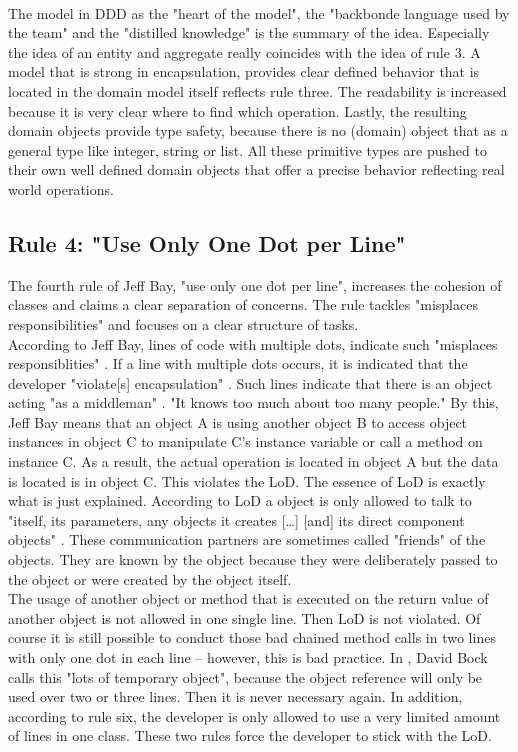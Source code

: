 \\
The model in \ac{DDD} as the "heart of the model", the "backbonde language used by the team" and the "distilled knowledge" \cite[p. 25]{dddbook} is the summary of the idea. Especially the idea of an entity and aggregate really coincides with the idea of rule 3. A model that is strong in encapsulation, provides clear defined behavior that is located in the domain model itself reflects rule three. The readability is increased because it is very clear where to find which operation. Lastly, the resulting domain objects provide type safety, because there is no (domain) object that as a general type like integer, string or list. All these primitive types are pushed to their own well defined domain objects that offer a precise behavior reflecting real world operations. 

\subsection*{Rule 4: "Use Only One Dot per Line"}
The fourth rule of Jeff Bay, "use only one dot per line", increases the cohesion of classes and claims a clear separation of concerns. The rule tackles "misplaces responsibilities" \cite{oc2008} and focuses on a clear structure of tasks.\\

According to Jeff Bay, lines of code with multiple dots, indicate such "misplaces responsiblities" \cite{oc2008}. If a line with multiple dots occurs, it is indicated that the developer "violate[s] encapsulation" \cite{oc2008}. Such lines indicate that there is an object acting "as a middleman" \cite{oc2008}. "It knows too much about too many people." \cite{oc2008} By this, Jeff Bay means that an object A is using another object B to access object instances in object C to manipulate C's instance variable or call a method on instance C. As a result, the actual operation is located in object A but the data is located is in object C. This violates the \ac{LoD}. The essence of \ac{LoD} is exactly what is just explained. According to \ac{LoD} a object is only allowed to talk to "itself, its parameters, any objects it creates [\dots] [and] its direct component objects" \cite{ba.com}. These communication partners are sometimes called "friends" of the objects. They are known by the object because they were deliberately passed to the object or were created by the object itself.  
\\

The usage of another object or method that is executed on the return value of another object is not allowed in one single line. Then \ac{LoD} is not violated. Of course it is still possible to conduct those bad chained method calls in two lines with only one dot in each line -- however, this is bad practice. In \cite{paperboy}, David Bock calls this "lots of temporary object", because the object reference will only be used over two or three lines. Then it is never necessary again. In addition, according to rule six, the developer is only allowed to use a very limited amount of lines in one class. These two rules force the developer to stick with the \ac{LoD}.
\\

